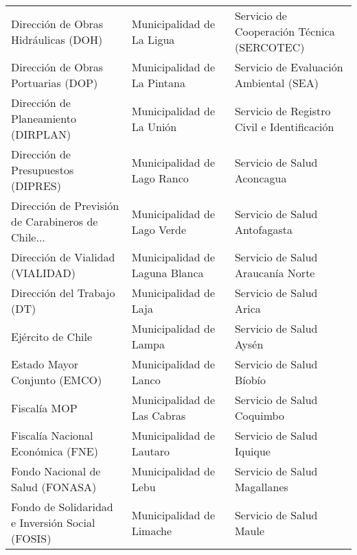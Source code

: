 \documentclass[11pt]{article}
\begin{document}
\begin{longtable}{ p{5cm} | p{5cm} | p{5cm} }
              Dirección de Obras Hidráulicas (DOH) &                          Municipalidad de La Ligua &         Servicio de Cooperación Técnica (SERCOTEC) \\
               Dirección de Obras Portuarias (DOP) &                        Municipalidad de La Pintana &             Servicio de Evaluación Ambiental (SEA) \\
               Dirección de Planeamiento (DIRPLAN) &                          Municipalidad de La Unión &        Servicio de Registro Civil e Identificación \\
                Dirección de Presupuestos (DIPRES) &                        Municipalidad de Lago Ranco &                        Servicio de Salud Aconcagua \\
 Dirección de Previsión de Carabineros de Chile... &                        Municipalidad de Lago Verde &                      Servicio de Salud Antofagasta \\
                  Dirección de Vialidad (VIALIDAD) &                     Municipalidad de Laguna Blanca &                  Servicio de Salud Araucanía Norte \\
                        Dirección del Trabajo (DT) &                              Municipalidad de Laja &                            Servicio de Salud Arica \\
                                 Ejército de Chile &                             Municipalidad de Lampa &                            Servicio de Salud Aysén \\
                      Estado Mayor Conjunto (EMCO) &                             Municipalidad de Lanco &                           Servicio de Salud Bíobío \\
                                      Fiscalía MOP &                        Municipalidad de Las Cabras &                         Servicio de Salud Coquimbo \\
                 Fiscalía Nacional Económica (FNE) &                           Municipalidad de Lautaro &                          Servicio de Salud Iquique \\
                  Fondo Nacional de Salud (FONASA) &                              Municipalidad de Lebu &                       Servicio de Salud Magallanes \\
   Fondo de Solidaridad e Inversión Social (FOSIS) &                           Municipalidad de Limache &                            Servicio de Salud Maule \\

\end{longtable}
\end{document}

